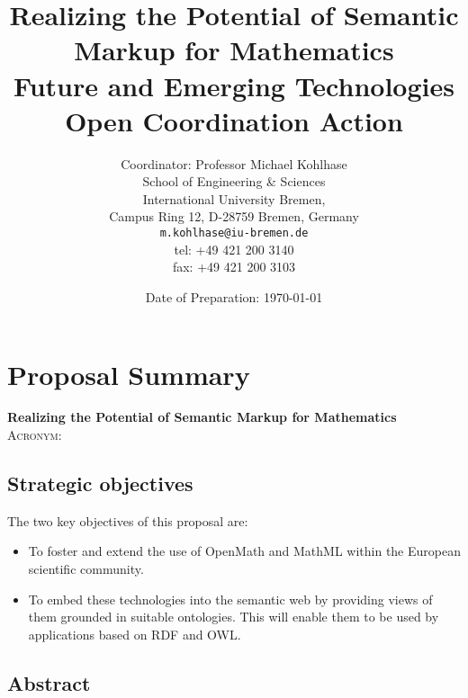 \documentclass{euproposal}
\def\omcoa{{\sc{OMCoA}}}
\begin{document}
\setcounter{part}{2}%

\title{Realizing the Potential of Semantic  Markup for Mathematics\\
  \normalfont\large Future and Emerging Technologies Open Coordination
  Action}

\date{Date of Preparation: \today}
\author{Coordinator: Professor Michael Kohlhase\\
  School of Engineering \& Sciences\\
  International University Bremen, \\
  Campus Ring 12, D-28759 Bremen, Germany\\ 
\texttt{m.kohlhase@iu-bremen.de}\\
tel: +49 421 200 3140 \\ fax: +49 421 200 3103} 

\titlepage 
\maketitle
\newpage
\tableofcontents

\setcounter{chapter}{0}

\section{Proposal Summary}

\textbf{Realizing the Potential of Semantic Markup for Mathematics}\\
\textsc{Acronym:} {\omcoa} \\


\subsection{Strategic objectives}

The two key objectives of this proposal are:
\begin{itemize}
\item To foster and extend the use of OpenMath and MathML within the
  European scientific community.
\item To embed these technologies into the semantic web by providing
  views of them grounded in suitable ontologies.  This will enable
  them to be used by applications based on RDF and OWL.
\end{itemize}


\subsection{Abstract}
\end{document}
